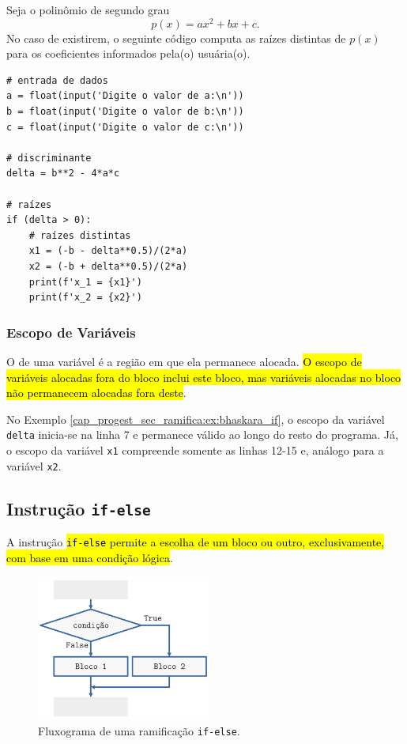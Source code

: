 \begin{ex}\label{cap_progest_sec_ramifica:ex:bhaskara_if}
  Seja o polinômio de segundo grau
  \begin{equation}
    p(x) = ax^2 + bx + c.
  \end{equation}
  No caso de existirem, o seguinte código computa as raízes distintas de $p(x)$ para os coeficientes informados pela(o) usuária(o).

\begin{lstlisting}
# entrada de dados
a = float(input('Digite o valor de a:\n'))
b = float(input('Digite o valor de b:\n'))
c = float(input('Digite o valor de c:\n'))

# discriminante
delta = b**2 - 4*a*c

# raízes
if (delta > 0):
    # raízes distintas
    x1 = (-b - delta**0.5)/(2*a)
    x2 = (-b + delta**0.5)/(2*a)
    print(f'x_1 = {x1}')
    print(f'x_2 = {x2}')
\end{lstlisting}

\end{ex}

\subsubsection{Escopo de Variáveis}

O  de uma variável é a região em que ela permanece alocada. \hl{O escopo de variáveis alocadas fora do bloco {\PYTHONif} inclui este bloco, mas variáveis alocadas no bloco {\PYTHONif} não permanecem alocadas fora deste}.

\begin{ex}
  No Exemplo \ref{cap_progest_sec_ramifica:ex:bhaskara_if}, o escopo da variável \lstinline+delta+ inicia-se na linha 7 e permanece válido ao longo do resto do programa. Já, o escopo da variável \lstinline+x1+ compreende somente as linhas 12-15 e, análogo para a variável \lstinline+x2+. 
\end{ex}

\subsection{Instrução \texttt{if-else}}

A instrução \hl{\texttt{if-else} permite a escolha de um bloco ou outro, exclusivamente, com base em uma condição lógica}.

\begin{figure}[H]
  \centering
  \includegraphics[width=2.25in]{./cap_progest/dados/fig_fg_else/fig.png}
  \caption{Fluxograma de uma ramificação \lstinline+if-else+.}
  \label{cap_progest_sec_ramifica:fig:fg_else}
\end{figure}

